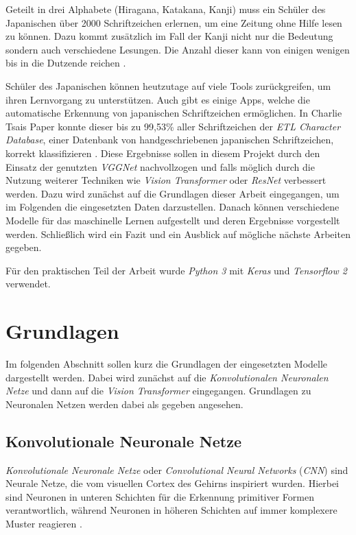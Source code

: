 \documentclass[twoside,a4paper]{IEEEtran}
\begin{document}
Geteilt in drei Alphabete (Hiragana, Katakana, Kanji) muss ein Schüler des Japanischen über 2000 Schriftzeichen erlernen, um eine Zeitung ohne Hilfe lesen zu können. Dazu kommt zusätzlich im Fall der Kanji nicht nur die Bedeutung sondern auch verschiedene Lesungen. Die Anzahl dieser kann von einigen wenigen bis in die Dutzende reichen \cite{ABOUT_JAPANESE}.

Schüler des Japanischen können heutzutage auf viele Tools zurückgreifen, um ihren Lernvorgang zu unterstützen. Auch gibt es einige Apps, welche die automatische Erkennung von japanischen Schriftzeichen ermöglichen. In Charlie Tsais Paper \cite{RHC} konnte dieser bis zu 99,53\% aller Schriftzeichen der \emph{ETL Character Database}, einer Datenbank von handgeschriebenen japanischen Schriftzeichen, korrekt klassifizieren \cite{RHC}. Diese Ergebnisse sollen in diesem Projekt durch den Einsatz der genutzten \emph{VGGNet} nachvollzogen und falls möglich durch die Nutzung weiterer Techniken wie \emph{Vision Transformer} oder \emph{ResNet} verbessert werden. Dazu wird zunächst auf die Grundlagen dieser Arbeit eingegangen, um im Folgenden die eingesetzten Daten darzustellen. Danach können verschiedene Modelle für das maschinelle Lernen aufgestellt und deren Ergebnisse vorgestellt werden. Schließlich wird ein Fazit und ein Ausblick auf mögliche nächste Arbeiten gegeben.

Für den praktischen Teil der Arbeit wurde \emph{Python 3} mit \emph{Keras} und \emph{Tensorflow 2} verwendet.
\section{Grundlagen}
Im folgenden Abschnitt sollen kurz die Grundlagen der eingesetzten Modelle dargestellt werden. Dabei wird zunächst auf die \emph{Konvolutionalen Neuronalen Netze} und dann auf die \emph{Vision Transformer} eingegangen. Grundlagen zu Neuronalen Netzen werden dabei als gegeben angesehen.
\subsection{Konvolutionale Neuronale Netze} %
\emph{Konvolutionale Neuronale Netze} oder \emph{Convolutional Neural Networks} (\emph{CNN}) sind Neurale Netze, die vom visuellen Cortex des Gehirns inspiriert wurden. Hierbei sind Neuronen in unteren Schichten für die Erkennung primitiver Formen verantwortlich, während Neuronen in höheren Schichten auf immer komplexere Muster reagieren \cite[S.360]{MACHINE_LEARNING}. 
\end{document}

